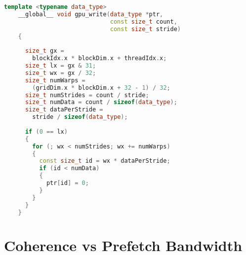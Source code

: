 \begin{lstlisting}[language=c++, caption=\texttt{gpu\_write} function., label=lst:gpu-write]
    template <typename data_type>
    __global__ void gpu_write(data_type *ptr,
                              const size_t count,
                              const size_t stride)
    {
    
      size_t gx = 
        blockIdx.x * blockDim.x + threadIdx.x;
      size_t lx = gx & 31;
      size_t wx = gx / 32;
      size_t numWarps = 
        (gridDim.x * blockDim.x + 32 - 1) / 32;
      size_t numStrides = count / stride;
      size_t numData = count / sizeof(data_type);
      size_t dataPerStride = 
        stride / sizeof(data_type);
    
      if (0 == lx)
      {
        for (; wx < numStrides; wx += numWarps)
        {
          const size_t id = wx * dataPerStride;
          if (id < numData)
          {
            ptr[id] = 0;
          }
        }
      }
    }
\end{lstlisting}

%
%
%
\section{Coherence vs Prefetch Bandwidth}
\label{sec:um-coherence-prefetch}

